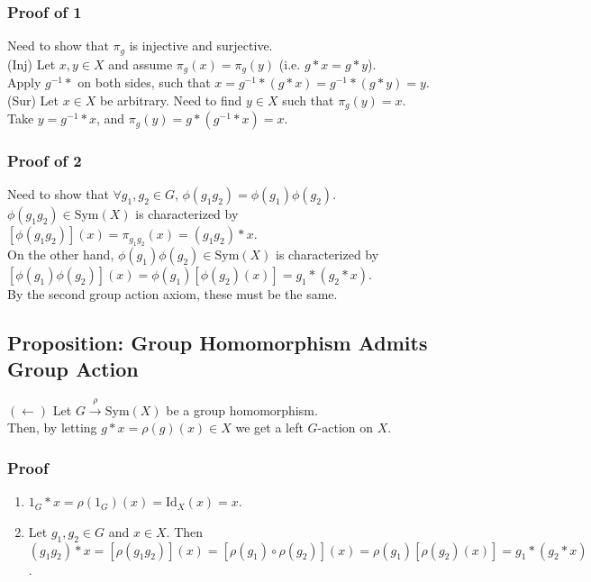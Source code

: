 \documentclass[11pt]{article}
\newcommand{\0}{\emptyset}
\begin{document}
\subsubsection*{Proof of 1}
\label{sec:orgd92f52f}
Need to show that \(\pi_{g}\) is injective and surjective.\\[0pt]
(Inj) Let \(x,y\in X\) and assume \(\pi_{g}(x)=\pi_{g}(y)\) (i.e. \(g*x=g*y\)).\\[0pt]
Apply \(g^{-1}*\) on both sides, such that \(x=g^{-1}*(g*x)=g^{-1}*(g*y)=y\).\\[0pt]
(Sur) Let \(x\in X\) be arbitrary. Need to find \(y\in X\) such that \(\pi_{g}(y)=x\).\\[0pt]
Take \(y=g^{-1}*x\), and \(\pi_{g}(y)=g*(g^{-1}*x)=x\).\\[0pt]
\subsubsection*{Proof of 2}
\label{sec:org9ac1e4a}
Need to show that \(\forall g_{1},g_{2}\in G\), \(\phi(g_{1}g_{2})=\phi(g_{1})\phi(g_{2})\).\\[0pt]
\(\phi(g_{1}g_{2})\in\text{Sym}(X)\) is characterized by \([\phi(g_{1}g_{2})](x)=\pi_{g_{1}g_{2}}(x)=(g_{1}g_{2})*x\).\\[0pt]
On the other hand, \(\phi(g_{1})\phi(g_{2})\in\text{Sym}(X)\) is characterized by \([\phi(g_{1})\phi(g_{2})](x)=\phi(g_{1})[\phi(g_{2})(x)]=g_{1}*(g_{2}*x)\).\\[0pt]
By the second group action axiom, these must be the same.\\[0pt]
\subsection*{Proposition: Group Homomorphism Admits Group Action}
\label{sec:org3b22022}
\((\longleftarrow)\) Let \(G\overset{\rho}{\to}\text{Sym}(X)\) be a group homomorphism.\\[0pt]
Then, by letting \(g*x=\rho(g)(x)\in X\) we get a left \(G\)-action on \(X\).\\[0pt]
\subsubsection*{Proof}
\label{sec:org4986f6c}
\begin{enumerate}
\item \(1_{G}*x=\rho(1_{G})(x)=\text{Id}_{X}(x)=x\).\\[0pt]
\item Let \(g_{1},g_{2}\in G\) and \(x\in X\). Then \((g_{1}g_{2})*x=[\rho(g_{1}g_{2})](x)=[\rho(g_{1})\circ\rho(g_{2})](x)=\rho(g_{1})[\rho(g_{2})(x)]=g_{1}*(g_{2}*x)\).\\[0pt]
\end{enumerate}
\end{document}
